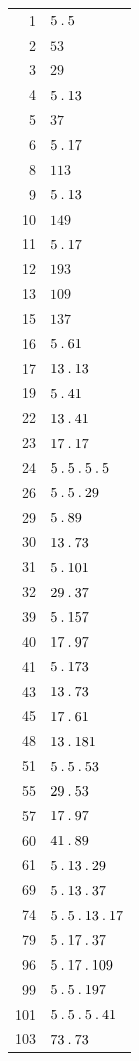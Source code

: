 \begin{longtable}{@{}r|l@{}}
1 & $5\mathbin{.} 5$\\
2 & $53$\\
3 & $29$\\
4 & $5\mathbin{.} 13$\\
5 & $37$\\
6 & $5\mathbin{.} 17$\\
8 & $113$\\
9 & $5\mathbin{.} 13$\\
10 & $149$\\
11 & $5\mathbin{.} 17$\\
12 & $193$\\
13 & $109$\\
15 & $137$\\
16 & $5\mathbin{.} 61$\\
17 & $13\mathbin{.} 13$\\
19 & $5\mathbin{.} 41$\\
22 & $13\mathbin{.} 41$\\
23 & $17\mathbin{.} 17$\\
24 & $5\mathbin{.} 5\mathbin{.} 5\mathbin{.} 5$\\
26 & $5\mathbin{.} 5\mathbin{.} 29$\\
29 & $5\mathbin{.} 89$\\
30 & $13\mathbin{.} 73$\\
31 & $5\mathbin{.} 101$\\
32 & $29\mathbin{.} 37$\\
39 & $5\mathbin{.} 157$\\
40 & $17\mathbin{.} 97$\\
41 & $5\mathbin{.} 173$\\
43 & $13\mathbin{.} 73$\\
45 & $17\mathbin{.} 61$\\
48 & $13\mathbin{.} 181$\\
51 & $5\mathbin{.} 5\mathbin{.} 53$\\
55 & $29\mathbin{.} 53$\\
57 & $17\mathbin{.} 97$\\
60 & $41\mathbin{.} 89$\\
61 & $5\mathbin{.} 13\mathbin{.} 29$\\
69 & $5\mathbin{.} 13\mathbin{.} 37$\\
74 & $5\mathbin{.} 5\mathbin{.} 13\mathbin{.} 17$\\
79 & $5\mathbin{.} 17\mathbin{.} 37$\\
96 & $5\mathbin{.} 17\mathbin{.} 109$\\
99 & $5\mathbin{.} 5\mathbin{.} 197$\\
101 & $5\mathbin{.} 5\mathbin{.} 5\mathbin{.} 41$\\
103 & $73\mathbin{.} 73$\\

\end{longtable}
